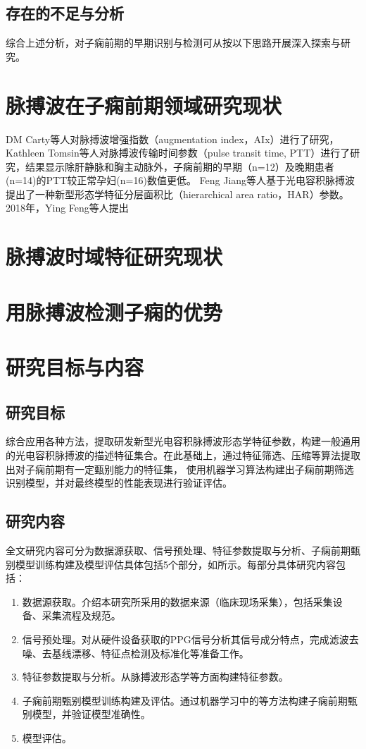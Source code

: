 \subsection{存在的不足与分析}
综合上述分析，对子痫前期的早期识别与检测可从按以下思路开展深入探索与研究。



\section{脉搏波在子痫前期领域研究现状}
DM Carty等人对脉搏波增强指数（augmentation index，AIx）进行了研究，
Kathleen Tomsin等人\cite{Tomsin2012}对脉搏波传输时间参数（pulse transit time, PTT）进行了研究，结果显示除肝静脉和胸主动脉外，子痫前期的早期（n=12）及晚期患者(n=14)的PTT较正常孕妇(n=16)数值更低。
Feng Jiang等人基于光电容积脉搏波提出了一种新型形态学特征分层面积比（hierarchical area ratio，HAR）参数。
2018年，Ying Feng等人提出


\section{脉搏波时域特征研究现状}

\section{用脉搏波检测子痫的优势}
\section{研究目标与内容}

\subsection{研究目标}
综合应用各种方法，提取研发新型光电容积脉搏波形态学特征参数，构建一般通用的光电容积脉搏波的描述特征集合。在此基础上，通过特征筛选、压缩等算法提取出对子痫前期有一定甄别能力的特征集，
使用机器学习算法构建出子痫前期筛选识别模型，并对最终模型的性能表现进行验证评估。
\subsection{研究内容}
全文研究内容可分为数据源获取、信号预处理、特征参数提取与分析、子痫前期甄别模型训练构建及模型评估具体包括5个部分，如所示。每部分具体研究内容包括：
\begin{enumerate}
    \item 数据源获取。介绍本研究所采用的数据来源（临床现场采集），包括采集设备、采集流程及规范。  
    \item 信号预处理。对从硬件设备获取的PPG信号分析其信号成分特点，完成滤波去噪、去基线漂移、特征点检测及标准化等准备工作。
    \item 特征参数提取与分析。从脉搏波形态学等方面构建特征参数。
    \item 子痫前期甄别模型训练构建及评估。通过机器学习中的等方法构建子痫前期甄别模型，并验证模型准确性。
    \item 模型评估。
\end{enumerate}


